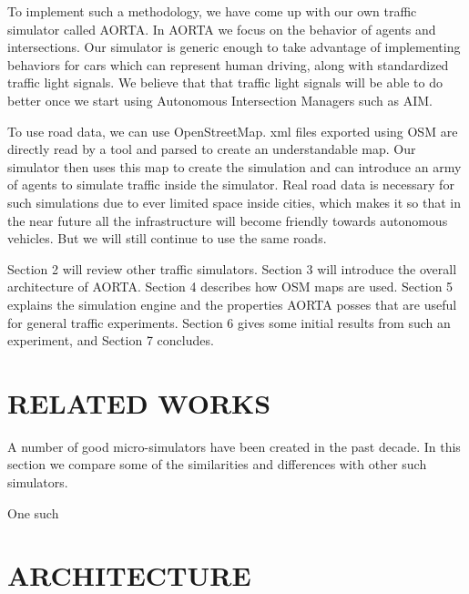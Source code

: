 \documentclass[letterpaper, 10 pt, conference]{ieeeconf}  %
\begin{document}
To implement such a methodology, we have come up with our own traffic simulator called AORTA. In AORTA we focus on the behavior of agents and intersections. Our simulator is generic enough to take advantage of implementing behaviors for cars which can represent human driving, along with standardized traffic light signals. We believe that that traffic light signals will be able to do better once we start using Autonomous Intersection Managers such as AIM.

To use road data, we can use OpenStreetMap. xml files exported using OSM are directly read by a tool and parsed to create an understandable map. Our simulator then uses this map to create the simulation and can introduce an army of agents to simulate traffic inside the simulator. Real road data is necessary for such simulations due to ever limited space inside cities, which makes it so that in the near future all the infrastructure will become friendly towards autonomous vehicles. But we will still continue to use the same roads.


Section 2 will review other traffic simulators. Section 3 will introduce the
overall architecture of AORTA. Section 4 describes how OSM maps are used.
Section 5 explains the simulation engine and the properties AORTA posses that
are useful for general traffic experiments. Section 6 gives some initial
results from such an experiment, and Section 7 concludes.


\section{RELATED WORKS}


A number of good micro-simulators have been created in the past decade. In this section we compare some of the similarities and differences with other such simulators.

One such 


\section{ARCHITECTURE}
\end{document}
